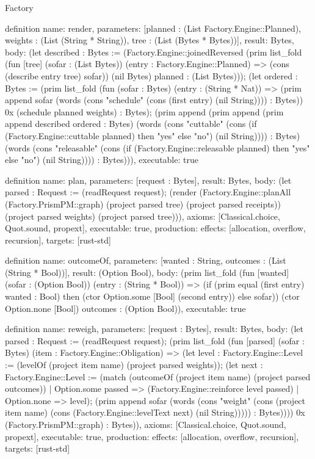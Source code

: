 \begin{lexlean}{Factory}
\begin{semanticmodule}
definition{
  name: render,
  parameters: [planned : (List Factory.Engine::Planned), weights : (List (String * String)), tree : (List (Bytes * Bytes))],
  result: Bytes,
  body: (let described : Bytes := (Factory.Engine::joinedReversed (prim list_fold (fun [tree] (sofar : (List Bytes)) (entry : Factory.Engine::Planned) => (cons (describe entry tree) sofar)) (nil Bytes) planned : (List Bytes))); (let ordered : Bytes := (prim list_fold (fun (sofar : Bytes) (entry : (String * Nat)) => (prim append sofar (words (cons "schedule" (cons (first entry) (nil String)))) : Bytes)) 0x (schedule planned weights) : Bytes); (prim append (prim append (prim append described ordered : Bytes) (words (cons "cuttable" (cons (if (Factory.Engine::cuttable planned) then "yes" else "no") (nil String)))) : Bytes) (words (cons "releasable" (cons (if (Factory.Engine::releasable planned) then "yes" else "no") (nil String)))) : Bytes))),
  executable: true
}

definition{
  name: plan,
  parameters: [request : Bytes],
  result: Bytes,
  body: (let parsed : Request := (readRequest request); (render (Factory.Engine::planAll (Factory.PrismPM::graph) (project parsed tree) (project parsed receipts)) (project parsed weights) (project parsed tree))),
  axioms: [Classical.choice, Quot.sound, propext],
  executable: true,
  production: {effects: [allocation, overflow, recursion], targets: [rust-std]}
}

definition{
  name: outcomeOf,
  parameters: [wanted : String, outcomes : (List (String * Bool))],
  result: (Option Bool),
  body: (prim list_fold (fun [wanted] (sofar : (Option Bool)) (entry : (String * Bool)) => (if (prim equal (first entry) wanted : Bool) then (ctor Option.some [Bool] (second entry)) else sofar)) (ctor Option.none [Bool]) outcomes : (Option Bool)),
  executable: true
}

definition{
  name: reweigh,
  parameters: [request : Bytes],
  result: Bytes,
  body: (let parsed : Request := (readRequest request); (prim list_fold (fun [parsed] (sofar : Bytes) (item : Factory.Engine::Obligation) => (let level : Factory.Engine::Level := (levelOf (project item name) (project parsed weights)); (let next : Factory.Engine::Level := (match (outcomeOf (project item name) (project parsed outcomes))
      | Option.some passed => (Factory.Engine::reinforce level passed)
      | Option.none => level); (prim append sofar (words (cons "weight" (cons (project item name) (cons (Factory.Engine::levelText next) (nil String))))) : Bytes)))) 0x (Factory.PrismPM::graph) : Bytes)),
  axioms: [Classical.choice, Quot.sound, propext],
  executable: true,
  production: {effects: [allocation, overflow, recursion], targets: [rust-std]}
}


\end{semanticmodule}
\end{lexlean}
